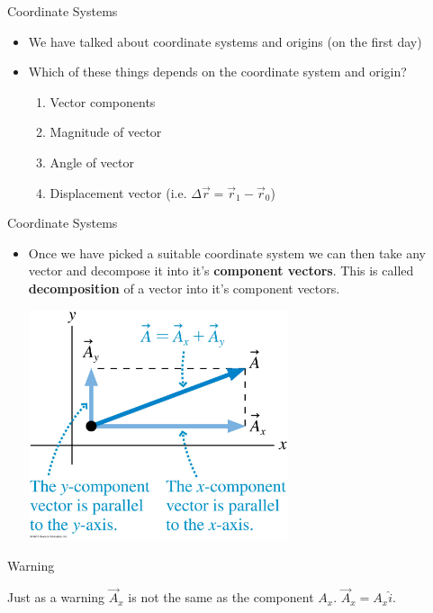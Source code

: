 \documentclass{beamer}
\begin{document}
\begin{frame}{Coordinate Systems}
\begin{itemize}
   \item We have talked about coordinate systems and origins (on the first day)
   \item Which of these things depends on the coordinate system and origin?
   \begin{enumerate}
      \item Vector components
      \item Magnitude of vector
      \item Angle of vector
      \item Displacement vector (i.e. $\Delta \vec{r} = \vec{r}_1 - \vec{r}_0$)
   \end{enumerate}
\end{itemize}
\begin{center}
\end{center}
\end{frame}

\begin{frame}{Coordinate Systems}
\begin{itemize}
   \item Once we have picked a suitable coordinate system we can then take any vector and decompose it into it's {\bf component vectors}. This is called {\bf decomposition} of a vector into it's component vectors.
   \begin{center}
      \includegraphics[width=0.6\textwidth]{../figures/03_10_Figure.jpg}
   \end{center}
\end{itemize}
\end{frame}

\begin{frame}{Warning}
\begin{center}
   Just as a warning $\vec{A}_x$ is not the same as the component $A_x$. $\vec{A}_x = A_x \hat{i}$.
\end{center}
\end{frame}
\end{document}
